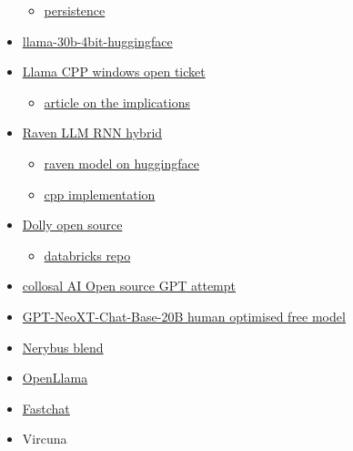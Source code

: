 \begin{itemize}
  \begin{itemize}
   
  \item
    \href{https://github.com/facebookresearch/llama/issues/162}{persistence}
  \end{itemize}
\item
  \href{https://huggingface.co/Neko-Institute-of-Science/LLaMA-30B-4bit-128g/tree/main}{llama-30b-4bit-huggingface}
\item
  \href{https://github.com/ggerganov/llama.cpp/issues/22}{Llama CPP
  windows open ticket}

  \begin{itemize}
   
  \item
    \href{https://arstechnica.com/information-technology/2023/03/you-can-now-run-a-gpt-3-level-ai-model-on-your-laptop-phone-and-raspberry-pi/}{article
    on the implications}
  \end{itemize}
\item
  \href{https://github.com/BlinkDL/RWKV-LM}{Raven LLM RNN hybrid}

  \begin{itemize}
   
  \item
    \href{https://huggingface.co/BlinkDL/rwkv-4-raven}{raven model on
    huggingface}
  \item
    \href{https://github.com/harrisonvanderbyl/rwkv-cpp-cuda}{cpp
    implementation}
  \end{itemize}
\item
  \href{https://www.databricks.com/blog/2023/04/12/dolly-first-open-commercially-viable-instruction-tuned-llm}{Dolly
  open source}

  \begin{itemize}
   
  \item
    \href{https://github.com/databrickslabs/dolly/tree/master/data}{databricks
    repo}
  \end{itemize}
\item
  \href{https://github.com/hpcaitech/ColossalAI}{collosal AI Open source
  GPT attempt}
\item
  \href{https://huggingface.co/togethercomputer/GPT-NeoXT-Chat-Base-20B}{GPT-NeoXT-Chat-Base-20B
  human optimised free model}
\item
  \href{https://huggingface.co/notstoic/OPT-13B-Nerybus-Mix-4bit-128g}{Nerybus
  blend}
\item
  \href{https://github.com/openlm-research/open_llama}{OpenLlama}
\item
  \href{https://huggingface.co/lmsys/fastchat-t5-3b-v1.0}{Fastchat}
\item
  Vircuna


\end{itemize}

